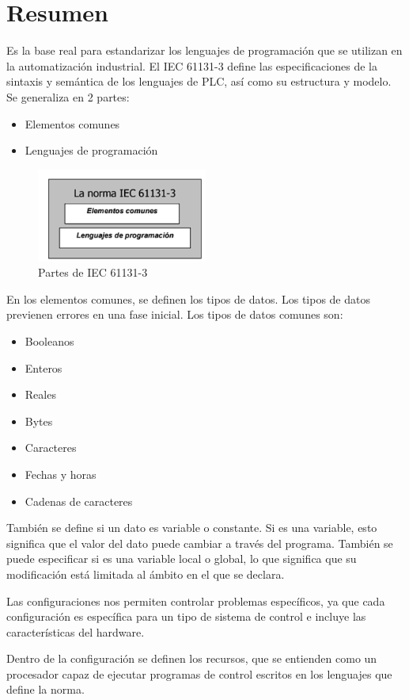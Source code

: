 \documentclass[12pt]{report}
\begin{document}
\chapter{Resumen}
Es la base real para estandarizar los lenguajes de programación que se utilizan en la automatización industrial.
El IEC 61131-3 define las especificaciones de la sintaxis y semántica de los lenguajes de PLC, así como su estructura y modelo.
Se generaliza en 2 partes:
\begin{itemize}
  \item Elementos comunes
  \item Lenguajes de programación
\end{itemize}
\begin{figure}[h]
  \centering
  \includegraphics[width=0.5\textwidth]{Imagen_1.png}
  \caption{Partes de IEC 61131-3}
  \label{fig:mi_imagen}
\end{figure}

En los elementos comunes, se definen los tipos de datos. Los tipos de datos previenen errores en una fase inicial.
Los tipos de datos comunes son:
\begin{itemize}
  \item Booleanos
  \item Enteros
  \item Reales
  \item Bytes
  \item Caracteres
  \item Fechas y horas
  \item Cadenas de caracteres
\end{itemize}
También se define si un dato es variable o constante. Si es una variable, esto significa que el valor del dato puede cambiar a través del programa. También se puede especificar si es una variable local o global, lo que significa que su modificación está limitada al ámbito en el que se declara.

Las configuraciones nos permiten controlar problemas específicos, ya que cada configuración es específica para un tipo de sistema de control e incluye las características del hardware.

Dentro de la configuración se definen los recursos, que se entienden como un procesador capaz de ejecutar programas de control escritos en los lenguajes que define la norma.
\end{document}
